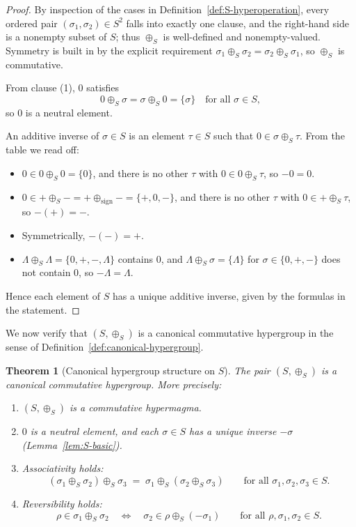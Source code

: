 \documentclass[11pt]{amsart}
\numberwithin{equation}{section}
\newtheorem{theorem}{Theorem}[section]
\theoremstyle{definition}
\theoremstyle{remark}
\newcommand{\Sset}{S}                      %
\newcommand{\sop}{\oplus_S}                %
\begin{document}
\begin{proof}
By inspection of the cases in
Definition~\ref{def:S-hyperoperation}, every ordered pair
$(\sigma_1,\sigma_2)\in\Sset^2$ falls into exactly one clause, and the
right-hand side is a nonempty subset of $\Sset$; thus $\sop$ is
well-defined and nonempty-valued.  Symmetry is built in by the
explicit requirement $\sigma_1\sop\sigma_2=\sigma_2\sop\sigma_1$, so
$\sop$ is commutative.

From clause (1), $0$ satisfies
\[
  0\sop\sigma
  = \sigma\sop 0
  = \{\sigma\}
  \quad\text{for all }\sigma\in\Sset,
\]
so $0$ is a neutral element.

An additive inverse of $\sigma\in\Sset$ is an element
$\tau\in\Sset$ such that $0\in\sigma\sop\tau$.  From the table we read
off:
\begin{itemize}[leftmargin=2em]
  \item $0\in0\sop0=\{0\}$, and there is no other $\tau$ with
        $0\in0\sop\tau$, so $-0=0$.
  \item $0\in+\sop-=+\oplus_{\mathrm{sign}}-=\{+,0,-\}$, and there is
        no other $\tau$ with $0\in+\sop\tau$, so $-(+)=-$.
  \item Symmetrically, $-(-)=+$.
  \item $\Lambda\sop\Lambda=\{0,+,-,\Lambda\}$ contains $0$, and
        $\Lambda\sop\sigma=\{\Lambda\}$ for $\sigma\in\{0,+,-\}$ does
        not contain $0$, so $-\Lambda=\Lambda$.
\end{itemize}
Hence each element of $\Sset$ has a unique additive inverse, given by
the formulas in the statement.
\end{proof}

We now verify that $(\Sset,\sop)$ is a canonical commutative
hypergroup in the sense of Definition~\ref{def:canonical-hypergroup}.

\begin{theorem}[Canonical hypergroup structure on $\Sset$]
\label{thm:S-canonical-hypergroup}
The pair $(\Sset,\sop)$ is a canonical commutative hypergroup.  More
precisely:
\begin{enumerate}
  \item $(\Sset,\sop)$ is a commutative hypermagma.
  \item $0$ is a neutral element, and each $\sigma\in\Sset$ has a
        unique inverse $-\sigma$ (Lemma~\ref{lem:S-basic}).
  \item Associativity holds:
  \[
    (\sigma_1\sop\sigma_2)\sop\sigma_3
    \;=\;
    \sigma_1\sop(\sigma_2\sop\sigma_3)
    \qquad\text{for all }
    \sigma_1,\sigma_2,\sigma_3\in\Sset.
  \]
  \item Reversibility holds:
  \[
    \rho\in\sigma_1\sop\sigma_2
    \quad\Longleftrightarrow\quad
    \sigma_2\in\rho\sop(-\sigma_1)
    \qquad\text{for all }\rho,\sigma_1,\sigma_2\in\Sset.
  \]
\end{enumerate}
\end{theorem}
\end{document}
